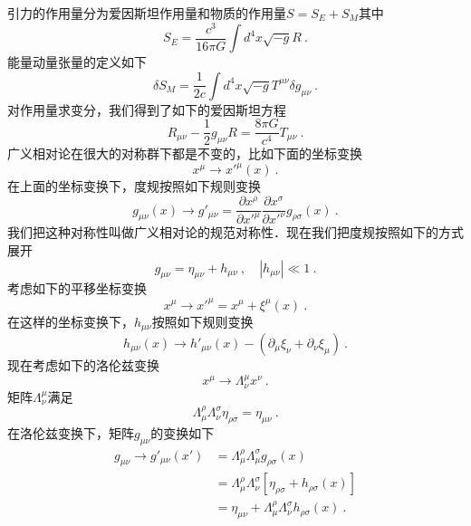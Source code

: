 引力的作用量分为爱因斯坦作用量和物质的作用量$S=S_E+S_M$其中
\begin{equation}
S_E = \frac{c^3}{16\pi G} \int d^4 x \sqrt{-g} R~.
\end{equation}
能量动量张量的定义如下
\begin{equation}
\delta S_M = \frac{1}{2 c} \int d^4 x \sqrt{-g} T^{\mu\nu} \delta g_{\mu\nu} ~. 
\end{equation}
对作用量求变分，我们得到了如下的爱因斯坦方程
\begin{equation}
R_{\mu\nu} - \frac{1}{2} g_{\mu\nu} R = \frac{8\pi G}{c^4} T_{\mu\nu} ~. 
\end{equation}
广义相对论在很大的对称群下都是不变的，比如下面的坐标变换
\begin{equation}
x^\mu \rightarrow x'^\mu (x) ~. 
\end{equation}
在上面的坐标变换下，度规按照如下规则变换
\begin{equation}
g_{\mu\nu} (x) \rightarrow g'_{\mu\nu}  = \frac{\partial x^\rho}{\partial x'^\mu} \frac{\partial x^\sigma}{\partial x'^\nu} g_{\rho\sigma} (x) ~. 
\end{equation}
我们把这种对称性叫做广义相对论的规范对称性．现在我们把度规按照如下的方式展开
\begin{equation}\label{Geomet_eq1}
g_{\mu\nu} = \eta_{\mu\nu} + h_{\mu\nu}~, \quad |h_{\mu\nu}| \ll 1 ~. 
\end{equation} 
考虑如下的平移坐标变换
\begin{equation}
x^\mu \rightarrow x'^\mu = x^\mu + \xi^\mu (x) ~. 
\end{equation}
在这样的坐标变换下，$h_{\mu\nu}$按照如下规则变换
\begin{equation}
h_{\mu\nu} (x) \rightarrow h'_{\mu\nu} (x) - (\partial_\mu\xi_\nu+\partial_\nu \xi_\mu) ~.
\end{equation}
现在考虑如下的洛伦兹变换
\begin{equation}
x^\mu \rightarrow \Lambda^\mu_\nu x^\nu ~.
\end{equation}
矩阵$\Lambda^\mu_\nu$满足
\begin{equation}
\Lambda^\rho_\mu\Lambda^\sigma_\nu \eta_{\rho\sigma} = \eta_{\mu\nu} ~. 
\end{equation}
在洛伦兹变换下，矩阵$g_{\mu\nu}$的变换如下
\begin{equation} 
\begin{aligned}
g_{\mu\nu} \rightarrow g'_{\mu\nu} (x') & = \Lambda^\rho_\mu \Lambda^\sigma_\mu g_{\rho\sigma} (x) \\ 
& = \Lambda^\rho_\mu \Lambda^\sigma_\nu [\eta_{\rho\sigma} + h_{\rho\sigma}(x)] \\
& = \eta_{\mu\nu} + \Lambda^\rho_\mu \Lambda^\sigma_\nu h_{\rho\sigma} (x) ~.
\end{aligned}
\end{equation}
